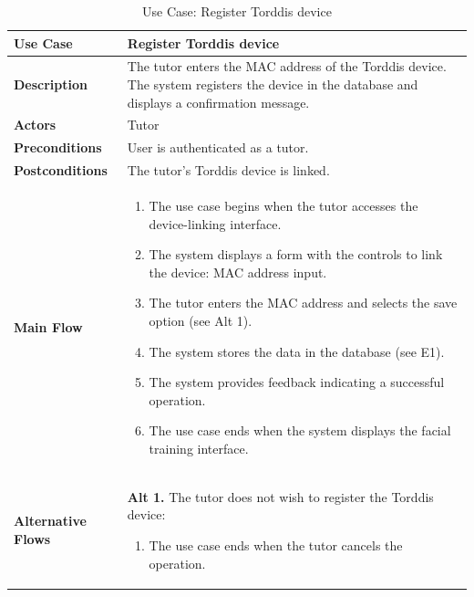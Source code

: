                 \begin{table}[!htbp]
                    \centering
                    \caption{Use Case: Register Torddis device}
                    \label{tab:use-case-register-device}
                    \begin{tabularx}{\textwidth}{|l|X|}
                        \hline
                        \textbf{Use Case} & Register Torddis device \\ \hline
                        \textbf{Description} & The tutor enters the MAC address of the Torddis device. The system registers the device in the database and displays a confirmation message. \\ \hline
                        \textbf{Actors} & Tutor \\ \hline
                        \textbf{Preconditions} & User is authenticated as a tutor. \\ \hline
                        \textbf{Postconditions} & The tutor's Torddis device is linked. \\ \hline
                        \textbf{Main Flow} &
                        \begin{enumerate}
                            \item The use case begins when the tutor accesses the device-linking interface.
                            \item The system displays a form with the controls to link the device: MAC address input.
                            \item The tutor enters the MAC address and selects the save option (see Alt 1).
                            \item The system stores the data in the database (see E1).
                            \item The system provides feedback indicating a successful operation.
                            \item The use case ends when the system displays the facial training interface.
                        \end{enumerate} \\ \hline
                        \textbf{Alternative Flows} &
                        \textbf{Alt 1.} The tutor does not wish to register the Torddis device:
                        \begin{enumerate}
                            \item[3.] The use case ends when the tutor cancels the operation.
                        \end{enumerate} \\ \hline

\end{tabularx}
\end{table}
